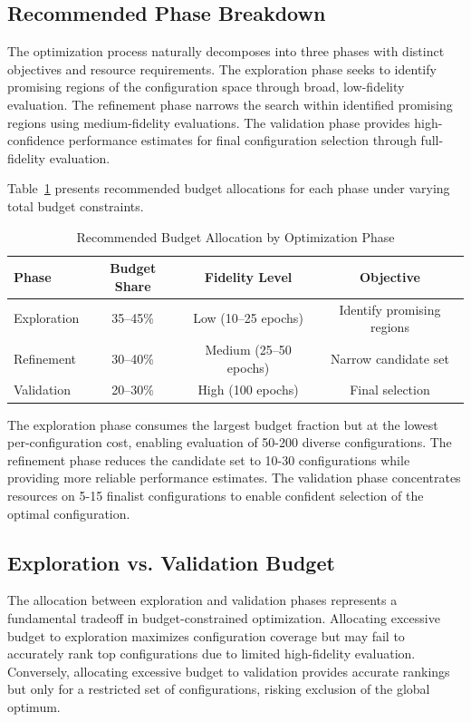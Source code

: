 \subsection{Recommended Phase Breakdown}

The optimization process naturally decomposes into three phases with distinct objectives and resource requirements. The exploration phase seeks to identify promising regions of the configuration space through broad, low-fidelity evaluation. The refinement phase narrows the search within identified promising regions using medium-fidelity evaluations. The validation phase provides high-confidence performance estimates for final configuration selection through full-fidelity evaluation.

Table~\ref{tab:phase_breakdown} presents recommended budget allocations for each phase under varying total budget constraints.

\begin{table}[htbp]
\centering
\caption{Recommended Budget Allocation by Optimization Phase}
\label{tab:phase_breakdown}
\begin{tabular}{lccc}
\hline
\textbf{Phase} & \textbf{Budget Share} & \textbf{Fidelity Level} & \textbf{Objective} \\
\hline
Exploration & 35--45\% & Low (10--25 epochs) & Identify promising regions \\
Refinement & 30--40\% & Medium (25--50 epochs) & Narrow candidate set \\
Validation & 20--30\% & High (100 epochs) & Final selection \\
\hline
\end{tabular}
\end{table}

The exploration phase consumes the largest budget fraction but at the lowest per-configuration cost, enabling evaluation of 50-200 diverse configurations. The refinement phase reduces the candidate set to 10-30 configurations while providing more reliable performance estimates. The validation phase concentrates resources on 5-15 finalist configurations to enable confident selection of the optimal configuration.

\subsection{Exploration vs. Validation Budget}

The allocation between exploration and validation phases represents a fundamental tradeoff in budget-constrained optimization. Allocating excessive budget to exploration maximizes configuration coverage but may fail to accurately rank top configurations due to limited high-fidelity evaluation. Conversely, allocating excessive budget to validation provides accurate rankings but only for a restricted set of configurations, risking exclusion of the global optimum.

